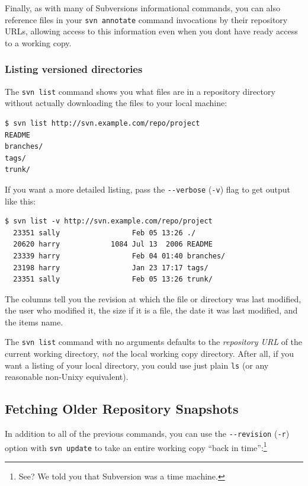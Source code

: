 Finally, as with many of Subversion\textquotesingle s informational
commands, you can also reference files in your \texttt{svn\ annotate}
command invocations by their repository URLs, allowing access to this
information even when you don\textquotesingle t have ready access to a
working copy.

\subsubsection{Listing versioned
directories}\label{svn.tour.history.browsing.list}

The \texttt{svn\ list} command shows you what files are in a repository
directory without actually downloading the files to your local machine:

\begin{verbatim}
$ svn list http://svn.example.com/repo/project
README
branches/
tags/
trunk/
\end{verbatim}

If you want a more detailed listing, pass the \texttt{-\/-verbose}
(\texttt{-v}) flag to get output like this:

\begin{verbatim}
$ svn list -v http://svn.example.com/repo/project
  23351 sally                 Feb 05 13:26 ./
  20620 harry            1084 Jul 13  2006 README
  23339 harry                 Feb 04 01:40 branches/
  23198 harry                 Jan 23 17:17 tags/
  23351 sally                 Feb 05 13:26 trunk/
\end{verbatim}

The columns tell you the revision at which the file or directory was
last modified, the user who modified it, the size if it is a file, the
date it was last modified, and the item\textquotesingle s name.

The \texttt{svn\ list} command with no arguments defaults to the
\emph{repository URL} of the current working directory, \emph{not} the
local working copy directory. After all, if you want a listing of your
local directory, you could use just plain \texttt{ls} (or any reasonable
non-Unixy equivalent).

\subsection{Fetching Older Repository
Snapshots}\label{svn.tour.history.snapshots}

In addition to all of the previous commands, you can use the
\texttt{-\/-revision} (\texttt{-r}) option with \texttt{svn\ update} to
take an entire working copy ``back in time'':\footnote{See? We told you
  that Subversion was a time machine.}

